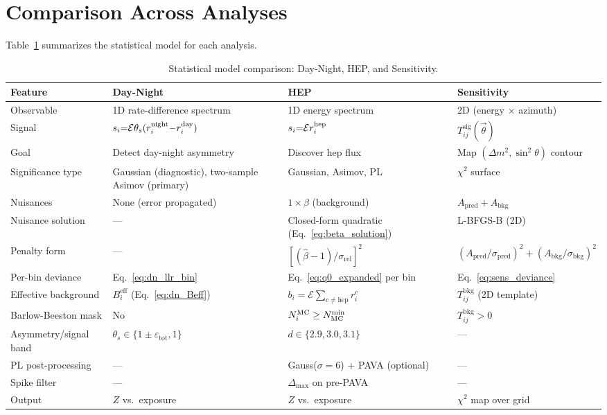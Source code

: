 \documentclass[12pt,a4paper]{article}
\newcommand{\Ecal}{\mathcal{E}}          %
\newcommand{\si}{s_{i}}                  %
\newcommand{\bi}{b_{i}}                  %
\newcommand{\Beff}{B^{\mathrm{eff}}_{i}} %
\newcommand{\epstot}{\varepsilon_{\mathrm{tot}}} %
\newcommand{\bhat}{\hat{\beta}}
\newcommand{\srel}{\sigma_{\mathrm{rel}}}
\newcommand{\Tsig}{T^{\mathrm{sig}}_{ij}}
\newcommand{\Tbkg}{T^{\mathrm{bkg}}_{ij}}
\newcommand{\Apred}{A_{\mathrm{pred}}}
\newcommand{\Abkg}{A_{\mathrm{bkg}}}
\newcommand{\spred}{\sigma_{\mathrm{pred}}}
\newcommand{\sbkg}{\sigma_{\mathrm{bkg}}}
\begin{document}
\section{Comparison Across Analyses}
\label{sec:comparison}

Table~\ref{tab:comparison} summarizes the statistical model for each
analysis.

\begin{table}[ht]
\centering
\caption{Statistical model comparison: Day-Night, HEP, and Sensitivity.}
\label{tab:comparison}
\begin{tabular}{p{3.2cm}p{3.5cm}p{3.5cm}p{3.5cm}}
\toprule
Feature & Day-Night & HEP & Sensitivity \\
\midrule
Observable
  & 1D rate-difference spectrum
  & 1D energy spectrum
  & 2D (energy $\times$ azimuth) \\
Signal
  & $\si{=}\Ecal\theta_s(r_i^{\rm night}{-}r_i^{\rm day})$
  & $\si{=}\Ecal r_i^{\rm hep}$
  & $\Tsig(\vec\theta)$ \\
Goal
  & Detect day-night asymmetry
  & Discover hep flux
  & Map $(\Delta m^2,\sin^2\theta)$ contour \\
Significance type
  & Gaussian (diagnostic), two-sample Asimov (primary)
  & Gaussian, Asimov, PL
  & $\chi^2$ surface \\
Nuisances
  & None (error propagated)
  & $1\times\beta$ (background)
  & $\Apred + \Abkg$ \\
Nuisance solution
  & ---
  & Closed-form quadratic (Eq.~\ref{eq:beta_solution})
  & L-BFGS-B (2D) \\
Penalty form
  & ---
  & $[(\bhat{-}1)/\srel]^2$
  & $(\Apred/\spred)^2{+}(\Abkg/\sbkg)^2$ \\
Per-bin deviance
  & Eq.~\eqref{eq:dn_llr_bin}
  & Eq.~\eqref{eq:q0_expanded} per bin
  & Eq.~\eqref{eq:sens_deviance} \\
Effective background
  & $\Beff$ (Eq.~\ref{eq:dn_Beff})
  & $\bi = \Ecal\sum_{c\neq\mathrm{hep}} r_i^c$
  & $\Tbkg$ (2D template) \\
Barlow-Beeston mask
  & No
  & $N_i^{\rm MC}\ge N_{\rm MC}^{\min}$
  & $\Tbkg>0$ \\
Asymmetry/signal band
  & $\theta_s\in\{1\pm\epstot,1\}$
  & $d\in\{2.9,3.0,3.1\}$
  & --- \\
PL post-processing
  & ---
  & Gauss($\sigma{=}6$) + PAVA (optional)
  & --- \\
Spike filter
  & ---
  & $\Delta_{\max}$ on pre-PAVA
  & --- \\
Output
  & $Z$ vs.\ exposure
  & $Z$ vs.\ exposure
  & $\chi^2$ map over grid \\
\bottomrule
\end{tabular}
\end{table}
\end{document}
